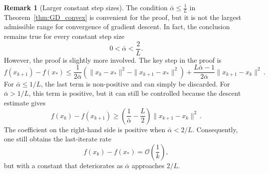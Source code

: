 \documentclass[12pt,openany]{book}
\theoremstyle{definition}
\newtheorem{remark}[thm]{Remark}
\theoremstyle{definition}
\begin{document}
\begin{remark}[Larger constant step sizes]
The condition $\bar \alpha\leq \frac{1}{L}$ in Theorem~\ref{thm:GD_convex} is convenient for the proof, but it is not the largest admissible range for convergence of gradient descent. In fact, the conclusion remains true for every constant step size
\[
0<\bar \alpha<\frac{2}{L}.
\]
However, the proof is slightly more involved. The key step in the proof is
\[
f(x_{k+1})-f(x_\ast)
\leq
\frac{1}{2\bar \alpha}
\left(
\|x_k-x_\ast\|^2-\|x_{k+1}-x_\ast\|^2
\right)
+
\frac{L\bar \alpha-1}{2\bar \alpha}
\|x_{k+1}-x_k\|^2\,.
\]
For $\bar \alpha\leq 1/L$, the last term is non-positive and can simply be discarded. For
$\bar \alpha>1/L$, this term is positive, but it can still be controlled because the descent estimate gives
\[
f(x_k)-f(x_{k+1})
\geq
\left(\frac{1}{\bar \alpha}-\frac{L}{2}\right)
\|x_{k+1}-x_k\|^2\,.
\]
The coefficient on the right-hand side is positive when $\bar \alpha<2/L$.
Consequently, one still obtains the last-iterate rate
\[
f(x_k)-f(x_\ast)=\mathcal{O}\left(\frac{1}{k}\right),
\]
but with a constant that deteriorates as $\bar \alpha$ approaches $2/L$. 
\end{remark}
\end{document}
